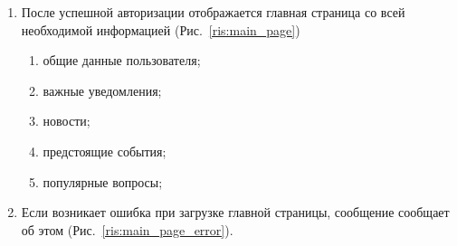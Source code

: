 \documentclass{../includes/TechDoc}
\begin{document}
\begin{enumerate}
        \item После успешной авторизации отображается главная страница со всей необходимой информацией (Рис.~\ref{ris:main_page})
        \begin{enumerate}
            \item общие данные пользователя;
            \item важные уведомления;
            \item новости;
            \item предстоящие события;
            \item популярные вопросы;
        \end{enumerate}

        \item Если возникает ошибка при загрузке главной страницы, сообщение сообщает об этом (Рис.~\ref{ris:main_page_error}).
        \begin{figure}[ht]
            \begin{center}
                \begin{minipage}[ht]{0.3\linewidth}

\end{minipage}
\end{center}
\end{figure}
\end{enumerate}
\end{document}
